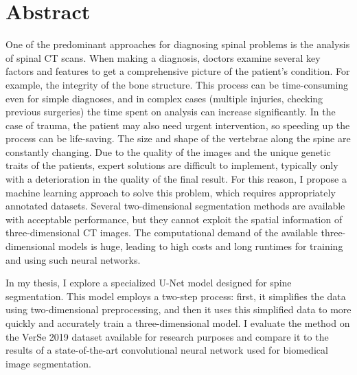 \chapter*{Abstract}

One of the predominant approaches for diagnosing spinal problems is the analysis of spinal CT scans. When making a diagnosis, doctors examine several key factors and features to get a comprehensive picture of the patient's condition. For example, the integrity of the bone structure. This process can be time-consuming even for simple diagnoses, and in complex cases (multiple injuries, checking previous surgeries) the time spent on analysis can increase significantly. In the case of trauma, the patient may also need urgent intervention, so speeding up the process can be life-saving. 
The size and shape of the vertebrae along the spine are constantly changing. Due to the quality of the images and the unique genetic traits of the patients, expert solutions are difficult to implement, typically only with a deterioration in the quality of the final result. For this reason, I propose a machine learning approach to solve this problem, which requires appropriately annotated datasets. 
Several two-dimensional segmentation methods are available with acceptable performance, but they cannot exploit the spatial information of three-dimensional CT images. The computational demand of the available three-dimensional models is huge, leading to high costs and long runtimes for training and using such neural networks.

In my thesis, I explore a specialized U-Net model designed for spine segmentation. This model employs a two-step process: first, it simplifies the data using two-dimensional preprocessing, and then it uses this simplified data to more quickly and accurately train a three-dimensional model. I evaluate the method on the VerSe 2019 dataset available for research purposes and compare it to the results of a state-of-the-art convolutional neural network used for biomedical image segmentation.


\vfill
\cleardoublepage

\selectthesislanguage

\setcounter{romanPage}{\value{page}}
